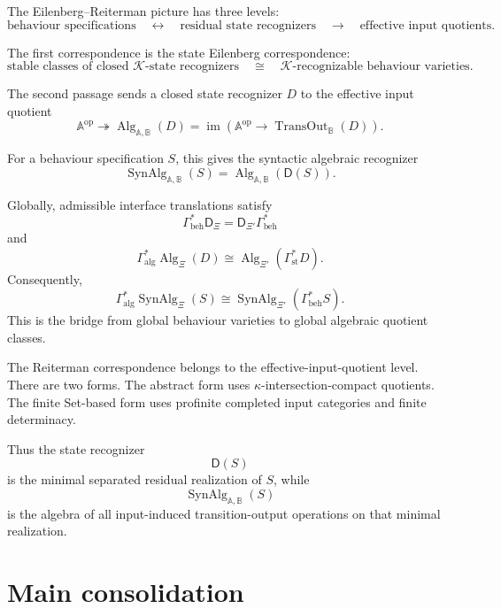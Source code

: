 The Eilenberg--Reiterman picture has three levels:
\[
\text{behaviour specifications}
\quad\longleftrightarrow\quad
\text{residual state recognizers}
\quad\longrightarrow\quad
\text{effective input quotients}.
\]

The first correspondence is the state Eilenberg correspondence:
\[
\text{stable classes of closed \(\mathcal K\)-state recognizers}
\quad\cong\quad
\text{\(\mathcal K\)-recognizable behaviour varieties}.
\]

The second passage sends a closed state recognizer \(D\) to the effective
input quotient
\[
\mathbb A^{\mathrm{op}}
\twoheadrightarrow
\operatorname{Alg}_{\mathbb A,\mathbb B}(D)
=
\operatorname{im}
\left(
\mathbb A^{\mathrm{op}}
\to
\operatorname{TransOut}_{\mathbb B}(D)
\right).
\]

For a behaviour specification \(S\), this gives the syntactic algebraic
recognizer
\[
\operatorname{SynAlg}_{\mathbb A,\mathbb B}(S)
=
\operatorname{Alg}_{\mathbb A,\mathbb B}(\mathsf D(S)).
\]

Globally, admissible interface translations satisfy
\[
\Gamma_{\mathrm{beh}}^\ast\mathsf D_\Xi
=
\mathsf D_{\Xi'}\Gamma_{\mathrm{beh}}^\ast
\]
and
\[
\Gamma_{\mathrm{alg}}^\ast
\operatorname{Alg}_\Xi(D)
\cong
\operatorname{Alg}_{\Xi'}(\Gamma_{\mathrm{st}}^\ast D).
\]
Consequently,
\[
\Gamma_{\mathrm{alg}}^\ast
\operatorname{SynAlg}_\Xi(S)
\cong
\operatorname{SynAlg}_{\Xi'}(\Gamma_{\mathrm{beh}}^\ast S).
\]
This is the bridge from global behaviour varieties to global algebraic
quotient classes.

The Reiterman correspondence belongs to the effective-input-quotient level.
There are two forms. The abstract form uses \(\kappa\)-intersection-compact
quotients. The finite Set-based form uses profinite completed input
categories and finite determinacy.

Thus the state recognizer
\[
\mathsf D(S)
\]
is the minimal separated residual realization of \(S\), while
\[
\operatorname{SynAlg}_{\mathbb A,\mathbb B}(S)
\]
is the algebra of all input-induced transition-output operations on that
minimal realization.

\section{Main consolidation}
\label{sec:eilenberg-reiterman-main-consolidation}

